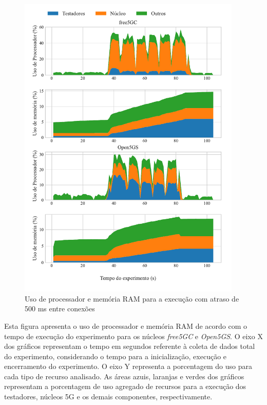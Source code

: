 \begin{figure}[H]
    \centering
    \includegraphics[width=0.95\textwidth]{TG2/Chapters/DataAnalysis/Figures/EXP1-CONN-RES-500ms-12C-8GB.pdf}
    \caption{Uso de processador e memória RAM para a execução com atraso de 500 ms entre conexões}
    \label{fig:exp1_500ms_res}
\end{figure}

Esta figura apresenta o uso de processador e memória RAM de acordo com o tempo de execução do experimento para os núcleos \textit{free5GC} e \textit{Open5GS}.
O eixo X dos gráficos representam o tempo em segundos referente à coleta de dados total do experimento, considerando o tempo para a inicialização, execução e encerramento do experimento.
O eixo Y representa a porcentagem do uso para cada tipo de recurso analisado.
As áreas azuis, laranjas e verdes dos gráficos representam a porcentagem de uso agregado de recursos para a execução dos testadores, núcleos 5G e os demais componentes, respectivamente.

